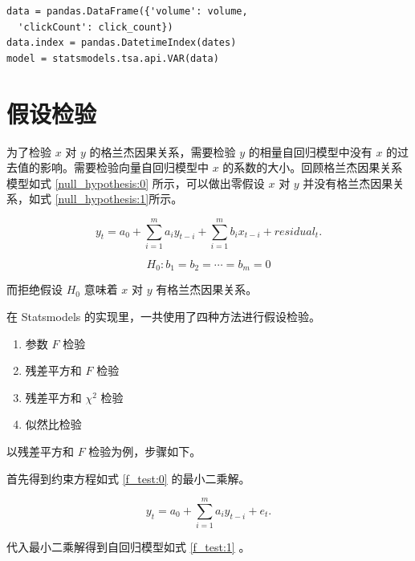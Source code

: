 \begin{minipage}{\textwidth}
  \begin{lstlisting}[caption=落后期选择逻辑, label=auto_regression:2]
data = pandas.DataFrame({'volume': volume,
  'clickCount': click_count})
data.index = pandas.DatetimeIndex(dates)
model = statsmodels.tsa.api.VAR(data)
  \end{lstlisting}
\end{minipage}

\section{假设检验}

为了检验 $x$ 对 $y$ 的格兰杰因果关系，需要检验 $y$ 的相量自回归模型中没有 $x$ 的过去值的影响。需要检验向量自回归模型中 $x$ 的系数的大小。回顾格兰杰因果关系模型如式 \ref{null_hypothesis:0} 所示，可以做出零假设 $x$ 对 $y$ 并没有格兰杰因果关系，如式 \ref{null_hypothesis:1}所示。

\begin{equation}
  \label{null_hypothesis:0}
  y_{t}=a_{0}+\sum_{i=1}^{m}a_{i}y_{t-i}+\sum_{i=1}^{m}b_{i}x_{t-i}+residual_{t}.
\end{equation}

\begin{equation}
  \label{null_hypothesis:1}
  H_{0}:b_{1}=b_{2}=\cdots =b_{m}=0
\end{equation}

而拒绝假设 $H_{0}$ 意味着 $x$ 对 $y$ 有格兰杰因果关系。

在 Statsmodels 的实现里，一共使用了四种方法进行假设检验。

\begin{enumerate}
  \item 参数 $F$ 检验
  \item 残差平方和 $F$ 检验
  \item 残差平方和 $\chi^{2}$ 检验
  \item 似然比检验
\end{enumerate}

以残差平方和 $F$ 检验为例，步骤如下。

首先得到约束方程如式 \ref{f_test:0} 的最小二乘解。

\begin{equation}
  \label{f_test:0}
  y_t=a_{0}+\sum_{i=1}^{m}a_{i}y_{t-i}+e_{t}.
\end{equation}

代入最小二乘解得到自回归模型如式 \ref{f_test:1} 。

